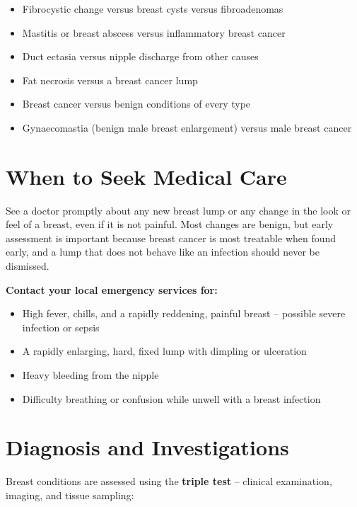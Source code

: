 \begin{itemize}
    \item Fibrocystic change versus breast cysts versus fibroadenomas
    \item Mastitis or breast abscess versus inflammatory breast cancer
    \item Duct ectasia versus nipple discharge from other causes
    \item Fat necrosis versus a breast cancer lump
    \item Breast cancer versus benign conditions of every type
    \item Gynaecomastia (benign male breast enlargement) versus male breast cancer
\end{itemize}

\section*{When to Seek Medical Care}
See a doctor promptly about any new breast lump or any change in the look or feel of a breast, even if it is not painful. Most changes are benign, but early assessment is important because breast cancer is most treatable when found early, and a lump that does not behave like an infection should never be dismissed.

\textbf{Contact your local emergency services for:}
\begin{itemize}
    \item High fever, chills, and a rapidly reddening, painful breast -- possible severe infection or sepsis
    \item A rapidly enlarging, hard, fixed lump with dimpling or ulceration
    \item Heavy bleeding from the nipple
    \item Difficulty breathing or confusion while unwell with a breast infection
\end{itemize}

\section*{Diagnosis and Investigations}
Breast conditions are assessed using the \textbf{triple test} -- clinical examination, imaging, and tissue sampling:

